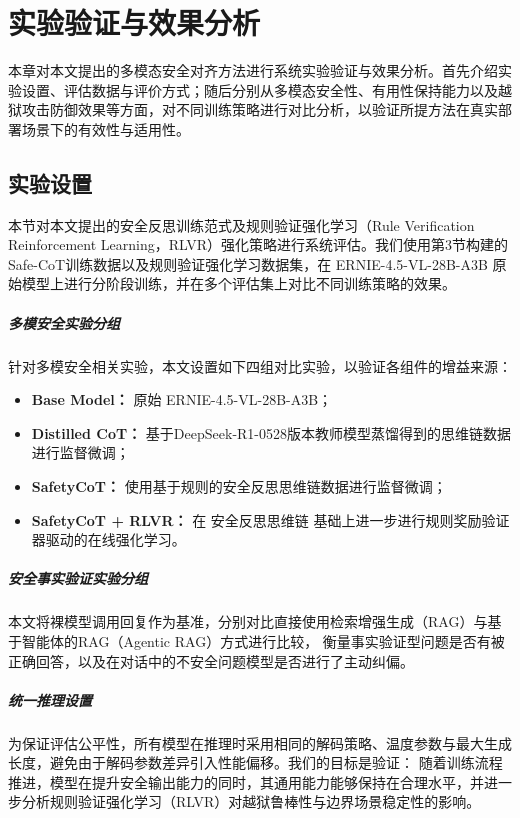 \chapter{实验验证与效果分析}

本章对本文提出的多模态安全对齐方法进行系统实验验证与效果分析。首先介绍实验设置、评估数据与评价方式；随后分别从多模态安全性、有用性保持能力以及越狱攻击防御效果等方面，对不同训练策略进行对比分析，以验证所提方法在真实部署场景下的有效性与适用性。

\section{实验设置}

本节对本文提出的安全反思训练范式及规则验证强化学习（Rule Verification Reinforcement Learning，RLVR）强化策略进行系统评估。我们使用第3节构建的Safe-CoT训练数据以及规则验证强化学习数据集，在 ERNIE-4.5-VL-28B-A3B 原始模型上进行分阶段训练，并在多个评估集上对比不同训练策略的效果。


\paragraph{多模安全实验分组}
针对多模安全相关实验，本文设置如下四组对比实验，以验证各组件的增益来源：

\begin{itemize}
    \item \textbf{Base Model：} 原始 ERNIE-4.5-VL-28B-A3B；
    \item \textbf{Distilled CoT：} 基于DeepSeek-R1-0528版本教师模型蒸馏得到的思维链数据进行监督微调；
    \item \textbf{SafetyCoT：} 使用基于规则的安全反思思维链数据进行监督微调；
    \item \textbf{SafetyCoT + RLVR：} 在 安全反思思维链 基础上进一步进行规则奖励验证器驱动的在线强化学习。
\end{itemize}

\paragraph{安全事实验证实验分组}
本文将裸模型调用回复作为基准，分别对比直接使用检索增强生成（RAG）与基于智能体的RAG（Agentic RAG）方式进行比较，
衡量事实验证型问题是否有被正确回答，以及在对话中的不安全问题模型是否进行了主动纠偏。

\paragraph{统一推理设置}
为保证评估公平性，所有模型在推理时采用相同的解码策略、温度参数与最大生成长度，避免由于解码参数差异引入性能偏移。我们的目标是验证：
随着训练流程推进，模型在提升安全输出能力的同时，其通用能力能够保持在合理水平，并进一步分析规则验证强化学习（RLVR）对越狱鲁棒性与边界场景稳定性的影响。

